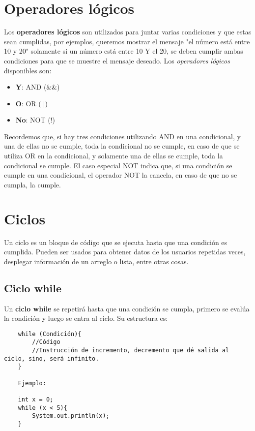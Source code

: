 \section{Operadores lógicos}
Los \textbf{operadores lógicos} son utilizados para juntar varias condiciones y que estas sean cumplidas, por ejemplos, queremos mostrar el mensaje "el número está entre 10 y 20" solamente si un número está entre 10 Y el 20, se deben cumplir ambas condiciones para que se muestre el mensaje deseado. Los \textit{operadores lógicos} disponibles son:
\begin{itemize}
    \item \textbf{Y}: AND (\&\&)
    \item \textbf{O}: OR (||)
    \item \textbf{No}: NOT (!)
\end{itemize}
Recordemos que, si hay tres condiciones utilizando AND en una condicional, y una de ellas no se cumple, toda la condicional no se cumple, en caso de que se utiliza OR en la condicional, y solamente una de ellas se cumple, toda la condicional se cumple. El caso especial NOT indica que, si una condición se cumple en una condicional, el operador NOT la cancela, en caso de que no se cumpla, la cumple.



\section{Ciclos}
Un ciclo es un bloque de código que se ejecuta hasta que una condición es cumplida. Pueden ser usados para obtener datos de los usuarios repetidas veces, desplegar información de un arreglo o lista, entre otras cosas.

\subsection{Ciclo while}
Un \textbf{ciclo while} se repetirá hasta que una condición se cumpla, primero se evalúa la condición y luego se entra al ciclo. Su estructura es:
\begin{lstlisting}
    while (Condición){
        //Código
        //Instrucción de incremento, decremento que dé salida al ciclo, sino, será infinito.
    }
    
    Ejemplo:
    
    int x = 0;
    while (x < 5){
        System.out.println(x);
    }
\end{lstlisting}

